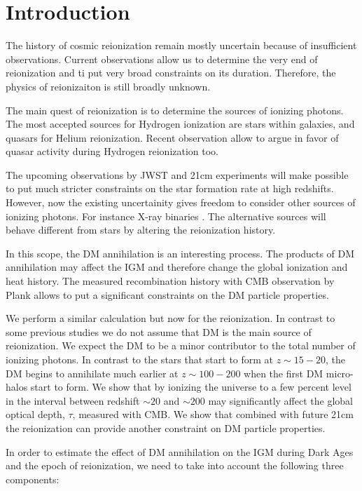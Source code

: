 \section{Introduction}

The history of cosmic reionization remain mostly uncertain because of insufficient observations. Current observations allow us to determine the very end of reionization and ti put very broad constraints on its duration. Therefore, the physics of reionizaiton is still broadly unknown.

The main quest of reionization is to determine the sources of ionizing photons. The most accepted sources for Hydrogen ionization are stars within galaxies, and quasars for Helium reionization. Recent observation allow \cite{2015arXiv150707678M} to argue in favor of quasar activity during Hydrogen reionization too.

The upcoming observations by JWST and 21cm experiments will make possible to put much stricter constraints on the star formation rate at high redshifts. However, now the existing uncertainity gives freedom to consider other sources of ionizing photons. For instance X-ray binaries \cite{Fialkov_2014}. The alternative sources will behave different from stars by altering the reionization history. 

In this scope, the DM annihilation is an interesting process. The products of DM annihilation may affect the IGM and therefore change the global ionization and heat history. The measured recombination history with CMB observation by Plank allows \cite{2015arXiv150603811S} to put a significant constraints on the DM particle properties.

We perform a similar calculation but now for the reionization. In contrast to some previous studies \cite{2009JCAP...10..009C, 2009PhRvD..80c5007B} we do not assume that DM is the main source of reionization. We expect the DM to be a minor contributor to the total number of ionizing photons. In contrast to the stars that start to form at $z\sim 15-20$, the DM begins to annihilate much earlier at $z\sim100-200$ when the first DM micro-halos start to form. We show that by ionizing the universe to a few percent level in the interval between redshift $\sim20$ and $\sim200$ may significantly affect the global optical depth, $\tau$, measured with CMB. We show that combined with future 21cm the reionization can provide another constraint on DM particle properties.

In order to estimate the effect of DM annihilation on the IGM during Dark Ages and the epoch of reionization, we need to take into account the following three components:

